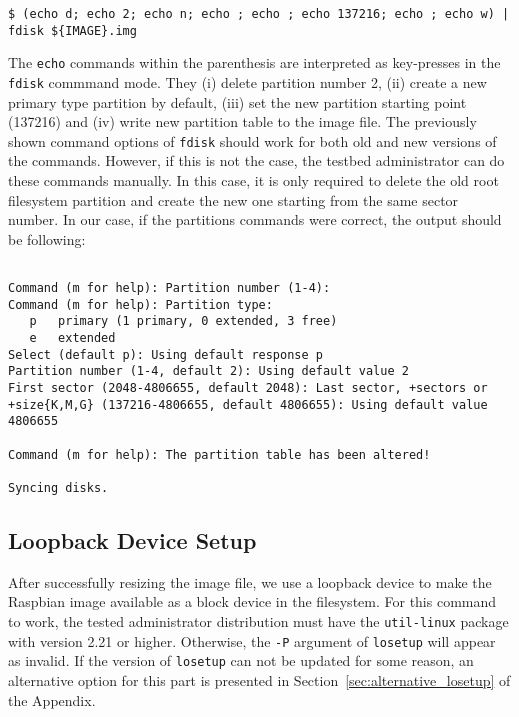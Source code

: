 \begin{lstlisting}[]
$ (echo d; echo 2; echo n; echo ; echo ; echo 137216; echo ; echo w) | fdisk ${IMAGE}.img
\end{lstlisting}
\FloatBarrier
\vspace{-5mm}

The \texttt{echo} commands within the parenthesis are interpreted as
key-presses in the \texttt{fdisk} commmand mode. They (i) delete partition
number 2, (ii) create a new primary type partition by default, (iii) set the
new partition starting point (137216) and (iv) write new partition table to
the image file. The previously shown command options of \texttt{fdisk}
should work for both old and new versions of the commands. However, if this
is not the case, the testbed administrator can do these commands manually.
In this case, it is only required to delete the old root
filesystem partition and create the new one starting from the same sector
number. In our case, if the partitions commands were correct, the output
should be following:

\begin{lstlisting}[]

Command (m for help): Partition number (1-4):
Command (m for help): Partition type:
   p   primary (1 primary, 0 extended, 3 free)
   e   extended
Select (default p): Using default response p
Partition number (1-4, default 2): Using default value 2
First sector (2048-4806655, default 2048): Last sector, +sectors or
+size{K,M,G} (137216-4806655, default 4806655): Using default value 4806655

Command (m for help): The partition table has been altered!

Syncing disks.

\end{lstlisting}
\FloatBarrier
\vspace{-5mm}

\subsection{Loopback Device Setup}
After successfully resizing the image file, we use a loopback device to make
the Raspbian image available as a block device in the filesystem. For this
command to work, the tested administrator distribution must have the
\texttt{util-linux} package with version 2.21 or higher. Otherwise, the
\texttt{-P} argument of \texttt{losetup} will appear as invalid. If the
version of \texttt{losetup} can not be updated for some reason, an
alternative option for this part is presented in
Section~\ref{sec:alternative_losetup} of the Appendix.

